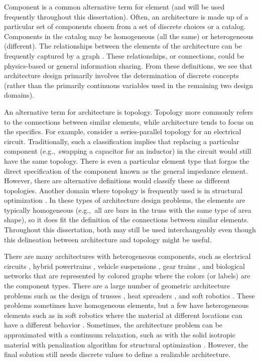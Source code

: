 Component is a common alternative term for element (and will be used frequently throughout this dissertation).
Often, an architecture is made up of a particular set of components chosen from a set of discrete choices or a catalog.
Components in the catalog may be homogeneous (all the same) or heterogeneous (different).
The relationships between the elements of the architecture can be frequently captured by a graph \cite{Herber2017a}.
These relationships, or connections, could be physics-based or general information sharing.
From these definitions, we see that architecture design primarily involves the determination of discrete concepts (rather than the primarily continuous variables used in the remaining two design domains).

An alternative term for architecture is topology.
Topology more commonly refers to the connections between similar elements, while architecture tends to focus on the specifics.
For example, consider a series-parallel topology for an electrical circuit.
Traditionally, such a classification implies that replacing a particular component (e.g.,~swapping a capacitor for an inductor) in the circuit would still have the same topology.
There is even a particular element type that forgos the direct specification of the component known as the general impedance element. 
However, there are alternative definitions would classify these as different topologies.
Another domain where topology is frequently used is in structural optimization \cite{Bendsoe2004a, Lohan2016c}.
In these types of architecture design problems, the elements are typically homogeneous (e.g.,~all are bars in the truss with the same type of area shape), so it does fit the definition of the connections between similar elements.
Throughout this dissertation, both may still be used interchangeably even though this delineation between architecture and topology might be useful.

There are many architectures with heterogeneous components, such as electrical circuits \cite{Macmahon1994a, Lomnicki1972a, Isokawa2016a,manuscript-pm-circuits}, hybrid powertrains \cite{Bayrak2016a}, vehicle suspensions \cite{Herber2017a}, gear trains \cite{Pennestri2015a, Castillo2002a}, and biological networks \cite{Ma2009a} that are represented by colored graphs where the colors (or labels) are the component types.
There are a large number of geometric architecture problems such as the design of trusses \cite{Bendsoe2004a}, heat spreaders \cite{Lohan2016c}, and soft robotics \cite{Cheney2013a}.
These problems sometimes have homogeneous elements, but a few have heterogeneous elements such as in soft robotics where the material at different locations can have a different behavior \cite{Cheney2013a}.
Sometimes, the architecture problem can be approximated with a continuum relaxation, such as with the solid isotropic material with penalization algorithm for structural optimization \cite{Bendsoe2004a, Lohan2016c}.
However, the final solution still needs discrete values to define a realizable architecture.

